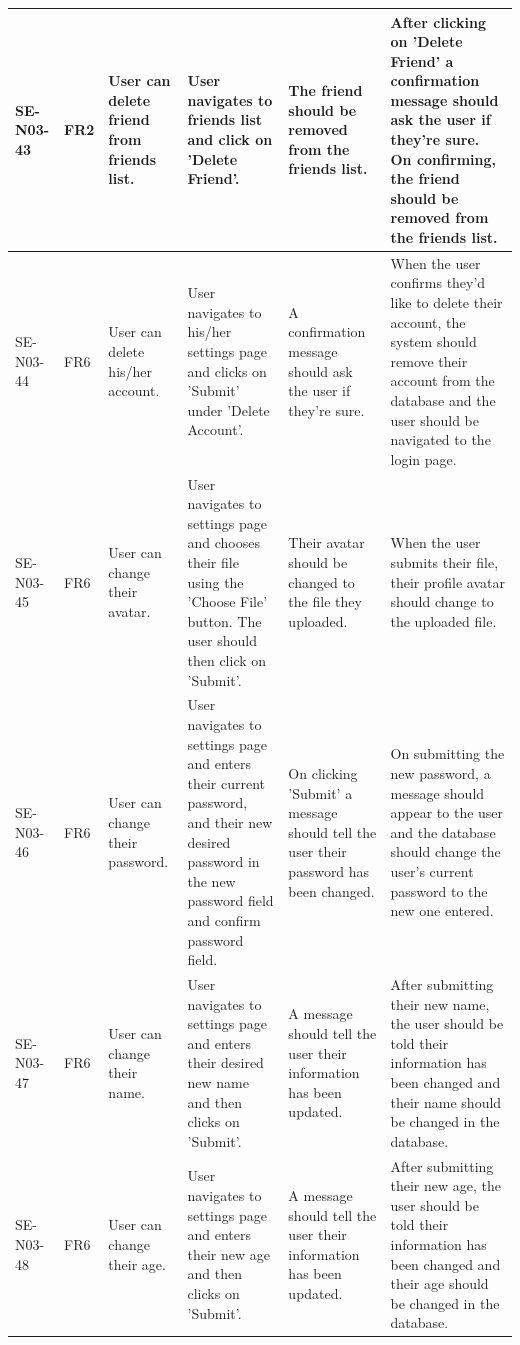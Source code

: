 \documentclass[a4paper]{article}
\begin{document}
\begin{landscape}
\begin{center}
\thispagestyle{empty}
	\begin{tabular}{| l | l | p{3cm} | p{3cm} | p{5cm} | p{7cm} |}
	\hline
	SE-N03-43 & FR2 & User can delete friend from friends list. & User navigates to friends list and click on 'Delete Friend'. & The friend should be removed from the friends list. & After clicking on 'Delete Friend' a confirmation message should ask the user if they're sure. On confirming, the friend should be removed from the friends list.\\
	\hline
	SE-N03-44 & FR6 & User can delete his/her account. & User navigates to his/her settings page and clicks on 'Submit' under 'Delete Account'. & A confirmation message should ask the user if they're sure. & When the user confirms they'd like to delete their account, the system should remove their account from the database and the user should be navigated to the login page.\\
	\hline
	SE-N03-45 & FR6 & User can change their avatar. & User navigates to settings page and chooses their file using the 'Choose File' button. The user should then click on 'Submit'. & Their avatar should be changed to the file they uploaded. & When the user submits their file, their profile avatar should change to the uploaded file.\\
	\hline
	SE-N03-46 & FR6 & User can change their password. & User navigates to settings page and enters their current password, and their new desired password in the new password field and confirm password field. & On clicking 'Submit' a message should tell the user their password has been changed. & On submitting the new password, a message should appear to the user and the database should change the user's current password to the new one entered.\\
	\hline
	SE-N03-47 & FR6 & User can change their name. & User navigates to settings page and enters their desired new name and then clicks on 'Submit'. & A message should tell the user their information has been updated. & After submitting their new name, the user should be told their information has been changed and their name should be changed in the database.\\
	\hline
	SE-N03-48 & FR6 & User can change their age. & User navigates to settings page and enters their new age and then clicks on 'Submit'. & A message should tell the user their information has been updated. & After submitting their new age, the user should be told their information has been changed and their age should be changed in the database.\\
	\hline	
\end{tabular}
\end{center}


\end{landscape}
\end{document}
